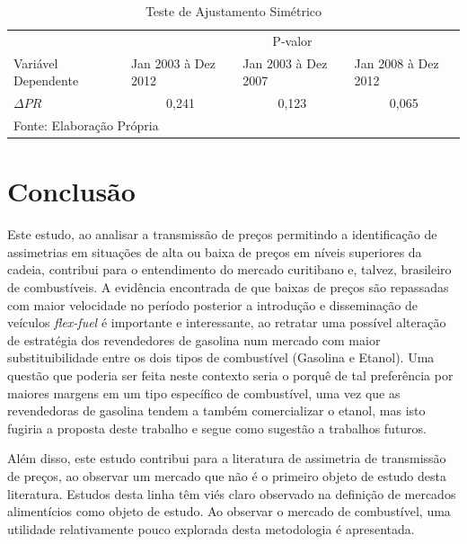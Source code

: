 \documentclass[
	article,			%
	12pt,				%
	openright,			%
	oneside,			%
	a4paper,			%
	english,			%
	brazil				%
	]{abntex2}
\begin{document}
\begin{table}[htbp]
  \centering
  \caption{Teste de Ajustamento Simétrico}
    \begin{tabular}{l|c|c|c}
    \toprule
     & \multicolumn{3}{c}{P-valor} \\
Variável Dependente  & \multicolumn{1}{l}{Jan 2003 à Dez 2012} & \multicolumn{1}{l}{Jan 2003 à Dez 2007} & \multicolumn{1}{l}{Jan 2008 à Dez 2012} \\ \hline
    $\Delta PR$ &  0,241      &  0,123     & 0,065  \\
    \bottomrule
    \multicolumn{4}{l}{Fonte: Elaboração Própria} \\
           \hline
    \end{tabular}%
  \label{teste}%
\end{table}%



\section{Conclusão}

Este estudo, ao analisar a transmissão de preços permitindo a identificação de assimetrias em situações de alta ou baixa de preços em níveis superiores da cadeia, contribui para o entendimento do mercado curitibano e, talvez, brasileiro de combustíveis. A evidência encontrada de que baixas de preços são repassadas com maior velocidade no período posterior a introdução e disseminação de veículos \textit{flex-fuel} é importante e interessante, ao retratar uma possível alteração de estratégia dos revendedores de gasolina num mercado com maior substituibilidade entre os dois tipos de combustível (Gasolina e Etanol). Uma questão que poderia ser feita neste contexto seria o porquê de tal preferência por maiores margens em um tipo específico de combustível, uma vez que as revendedoras de gasolina tendem a também comercializar o etanol, mas isto fugiria a proposta deste trabalho e segue como sugestão a trabalhos futuros.

Além disso, este estudo contribui para a literatura de assimetria de transmissão de preços, ao observar um mercado que não é o primeiro objeto de estudo desta literatura. Estudos desta linha têm viés claro observado na definição de mercados alimentícios como objeto de estudo. Ao observar o mercado de combustível, uma utilidade relativamente pouco explorada desta metodologia é apresentada.


\cleardoublepage




\end{document}
